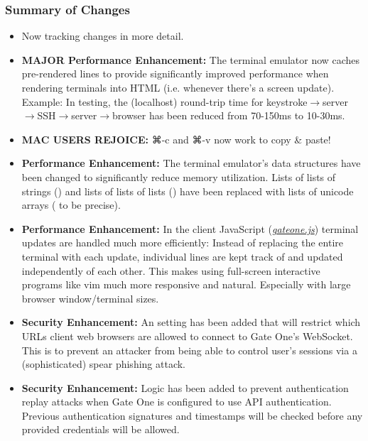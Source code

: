 \documentclass[letterpaper,10pt,openany]{sphinxmanual}
\begin{document}
\subsubsection{Summary of Changes}
\label{ReleaseNotes/index:id7}\begin{itemize}
\item {} 
Now tracking changes in more detail.

\item {} 
\textbf{MAJOR Performance Enhancement:}  The terminal emulator now caches pre-rendered lines to provide significantly improved performance when rendering terminals into HTML (i.e. whenever there's a screen update).  Example:  In testing, the (localhost) round-trip time for keystroke\(\rightarrow\)server\(\rightarrow\)SSH\(\rightarrow\)server\(\rightarrow\)browser has been reduced from 70-150ms to 10-30ms.

\item {} 
\textbf{MAC USERS REJOICE:} ⌘-c and ⌘-v now work to copy \& paste!

\item {} 
\textbf{Performance Enhancement:}  The terminal emulator's data structures have been changed to significantly reduce memory utilization.  Lists of lists of strings () and lists of lists of lists () have been replaced with lists of unicode arrays ( to be precise).

\item {} 
\textbf{Performance Enhancement:}  In the client JavaScript ({\hyperref[Developer/js_gateone:gateone-javascript]{\emph{gateone.js}}}) terminal updates are handled much more efficiently:  Instead of replacing the entire terminal  with each update, individual lines are kept track of and updated independently of each other.  This makes using full-screen interactive programs like vim much more responsive and natural.  Especially with large browser window/terminal sizes.

\item {} 
\textbf{Security Enhancement:}  An  setting has been added that will restrict which URLs client web browsers are allowed to connect to Gate One's WebSocket.  This is to prevent an attacker from being able to control user's sessions via a (sophisticated) spear phishing attack.

\item {} 
\textbf{Security Enhancement:}  Logic has been added to prevent authentication replay attacks when Gate One is configured to use API authentication.  Previous authentication signatures and timestamps will be checked before any provided credentials will be allowed.


\end{itemize}
\end{document}
